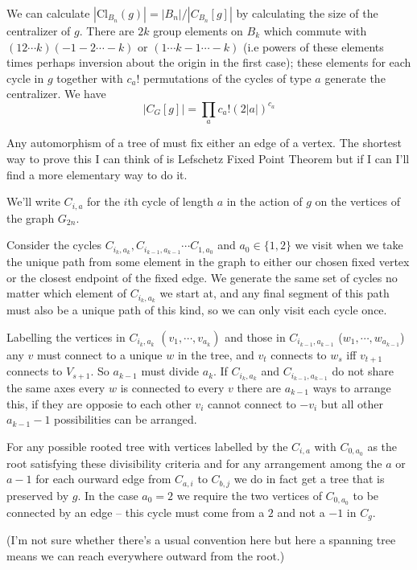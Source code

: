 \documentclass[10pt]{article}
\newcommand{\Cl}{\text{Cl}}
\begin{document}
  We can calculate $|\Cl_{B_n}(g)|=|B_n|/|C_{B_n}[g]|$ by calculating the size of the centralizer of $g$. There are $2k$ group elements on $B_k$ which commute with $(1 2 \cdots k)(-1 -2 \cdots -k)$ or $(1 \cdots k-1 \cdots -k)$ (i.e powers of these elements times perhaps inversion about the origin in the first case); these elements for each cycle in $g$ together with $c_a!$ permutations of the cycles of type $a$ generate the centralizer. We have 
  \[|C_G[g]|= \prod_a c_a!(2|a|)^{c_a}\]

  Any automorphism of a tree of must fix either an edge of a vertex. The shortest way to prove this I can think of is Lefschetz Fixed Point Theorem but if I can I'll find a more elementary way to do it.
  
  We'll write $C_{i,a}$ for the $i$th cycle of length $a$ in the action of $g$ on the vertices of the graph $G_{2n}$.

  Consider the cycles $ C_{i_k,a_k},C_{i_{k-1},a_{k-1}} \cdots C_{1,a_0}$ and $a_0 \in \{1,2\}$ we visit when we take the unique path from some element in the graph to either our chosen fixed vertex or the closest endpoint of the fixed edge. We generate the same set of cycles no matter which element of $C_{i_k,a_k}$ we start at, and any final segment of this path must also be a unique path of this kind, so we can only visit each cycle once.

  Labelling the vertices in $C_{i_k, a_k}$ $(v_1, \cdots, v_{a_k})$ and those in $C_{i_{k-1},a_{k-1}}$ ($w_1,\cdots, w_{a_{k-1}}$) any $v$ must connect to a unique $w$ in the tree, and $v_t$ connects to $w_s$ iff $v_{t+1}$ connects to $V_{s+1}$.  So $a_{k-1}$ must divide $a_k$. If $C_{i_k,a_k}$ and $C_{i_{k-1},a_{k-1}}$ do not share the same axes every $w$ is connected to every $v$ there are $a_{k-1}$ ways to arrange this, if they are opposie to each other $v_i$ cannot connect to $-v_i$ but all other $a_{k-1}-1$ possibilities can  be arranged.

  

  For any possible rooted tree with vertices labelled by the $C_{i,a}$ with $C_{0,a_0}$ as the root satisfying these divisibility criteria and for any arrangement among the $a$ or $a-1$ for each ourward edge from $C_{a,i}$ to $C_{b,j}$ we do in fact get a tree that is preserved by $g$.  In the case $a_0=2$ we require the two vertices of $C_{0,a_0}$ to be connected by an edge -- this cycle must come from a $2$ and not a $-1$ in $C_g$.

  (I'm not sure whether there's a usual convention here but here a spanning tree means we can reach everywhere outward from the root.)
\end{document}
